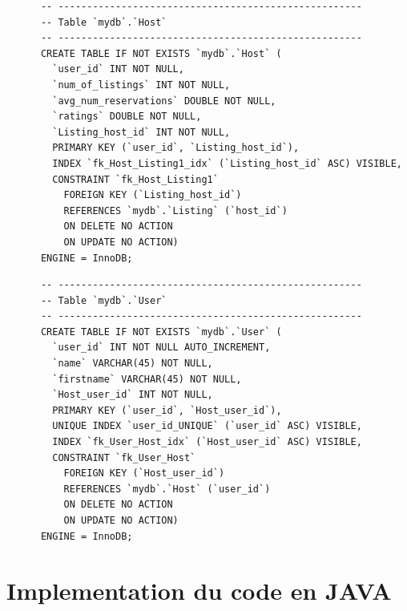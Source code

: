 \documentclass{report}
\begin{document}
    \begin{lstlisting}
      -- -----------------------------------------------------
      -- Table `mydb`.`Host`
      -- -----------------------------------------------------
      CREATE TABLE IF NOT EXISTS `mydb`.`Host` (
        `user_id` INT NOT NULL,
        `num_of_listings` INT NOT NULL,
        `avg_num_reservations` DOUBLE NOT NULL,
        `ratings` DOUBLE NOT NULL,
        `Listing_host_id` INT NOT NULL,
        PRIMARY KEY (`user_id`, `Listing_host_id`),
        INDEX `fk_Host_Listing1_idx` (`Listing_host_id` ASC) VISIBLE,
        CONSTRAINT `fk_Host_Listing1`
          FOREIGN KEY (`Listing_host_id`)
          REFERENCES `mydb`.`Listing` (`host_id`)
          ON DELETE NO ACTION
          ON UPDATE NO ACTION)
      ENGINE = InnoDB;
    \end{lstlisting}

    \begin{lstlisting}
      -- -----------------------------------------------------
      -- Table `mydb`.`User`
      -- -----------------------------------------------------
      CREATE TABLE IF NOT EXISTS `mydb`.`User` (
        `user_id` INT NOT NULL AUTO_INCREMENT,
        `name` VARCHAR(45) NOT NULL,
        `firstname` VARCHAR(45) NOT NULL,
        `Host_user_id` INT NOT NULL,
        PRIMARY KEY (`user_id`, `Host_user_id`),
        UNIQUE INDEX `user_id_UNIQUE` (`user_id` ASC) VISIBLE,
        INDEX `fk_User_Host_idx` (`Host_user_id` ASC) VISIBLE,
        CONSTRAINT `fk_User_Host`
          FOREIGN KEY (`Host_user_id`)
          REFERENCES `mydb`.`Host` (`user_id`)
          ON DELETE NO ACTION
          ON UPDATE NO ACTION)
      ENGINE = InnoDB;
    \end{lstlisting}
\chapter{Implementation du code en JAVA}
\end{document}
